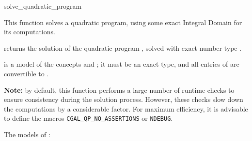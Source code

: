 \begin{ccRefFunction}{solve_quadratic_program}


This function solves a quadratic program, using some exact
Integral Domain  for its computations.   

{returns the solution of the quadratic program , solved
with exact number type .}

 is a model of the concepts  and
; it must
be an exact type, and all entries of  are convertible to 
.

{\bf Note:} by default, this function performs a large number of 
runtime-checks to ensure consistency during the solution process.
However, these checks slow down the computations by a considerable
factor. For maximum efficiency, it is advisable to define the macros
\texttt{CGAL\_QP\_NO\_ASSERTIONS} or \texttt{NDEBUG}.

\ccSeeAlso

The models of :

\\
\\
\\

\end{ccRefFunction}
